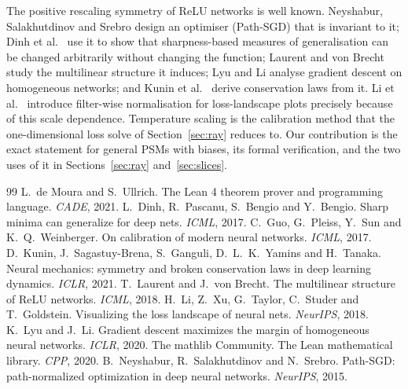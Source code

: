 \documentclass[11pt]{article}
\theoremstyle{definition}
\theoremstyle{remark}
\begin{document}
The positive rescaling symmetry of ReLU networks is well known. Neyshabur, Salakhutdinov and
Srebro \cite{neyshabur2015path} design an optimiser (Path-SGD) that is invariant to it; Dinh et
al.~\cite{dinh2017sharp} use it to show that sharpness-based measures of generalisation can be
changed arbitrarily without changing the function; Laurent and von Brecht
\cite{laurent2018multilinear} study the multilinear structure it induces; Lyu and Li
\cite{lyu2020gradient} analyse gradient descent on homogeneous networks; and Kunin et
al.~\cite{kunin2021neural} derive conservation laws from it. Li et al.~\cite{li2018visualizing}
introduce filter-wise normalisation for loss-landscape plots precisely because of this scale
dependence. Temperature scaling \cite{guo2017calibration} is the calibration method that the
one-dimensional loss solve of Section~\ref{sec:ray} reduces to. Our contribution is the exact
statement for general PSMs with biases, its formal verification, and the two uses of it in
Sections~\ref{sec:ray} and~\ref{sec:slices}.

\begin{thebibliography}{99}\small
{} L.~de Moura and S.~Ullrich. The Lean 4 theorem prover and programming
  language. \emph{CADE}, 2021.
 L.~Dinh, R.~Pascanu, S.~Bengio and Y.~Bengio. Sharp minima can generalize
  for deep nets. \emph{ICML}, 2017.
 C.~Guo, G.~Pleiss, Y.~Sun and K.~Q.~Weinberger. On calibration of
  modern neural networks. \emph{ICML}, 2017.
 D.~Kunin, J.~Sagastuy-Brena, S.~Ganguli, D.~L.~K.~Yamins and
  H.~Tanaka. Neural mechanics: symmetry and broken conservation laws in deep learning dynamics.
  \emph{ICLR}, 2021.
 T.~Laurent and J.~von Brecht. The multilinear structure of ReLU
  networks. \emph{ICML}, 2018.
 H.~Li, Z.~Xu, G.~Taylor, C.~Studer and T.~Goldstein. Visualizing the
  loss landscape of neural nets. \emph{NeurIPS}, 2018.
 K.~Lyu and J.~Li. Gradient descent maximizes the margin of homogeneous
  neural networks. \emph{ICLR}, 2020.
 The mathlib Community. The Lean mathematical library. \emph{CPP}, 2020.
 B.~Neyshabur, R.~Salakhutdinov and N.~Srebro. Path-SGD:
  path-normalized optimization in deep neural networks. \emph{NeurIPS}, 2015.
\end{thebibliography}
\end{document}
